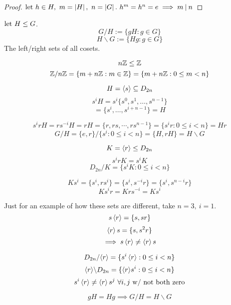 \documentclass[12pt]{article}
\newcommand{\order}[1]{\left\lvert#1\right\rvert}
\newcommand{\divides}{\mathbin|}
\newcommand\subgroup{\le}
\begin{document}
\bboxproof
\begin{proof}
    \(\llet\ h\in H,\ m=\order{H},\ n=\order{G}.\ h^m=h^n=e\implies m\divides n\)
\end{proof}
\ebox

\bboxdefn
\begin{defn}
    \(\llet\ H\subgroup G\).
    \[
        G/H:=\{
            gH : g\in G
        \}
    \]
    \[
        H\backslash G:=\{
            Hg : g\in G
        \}
    \]
    The left/right sets of all cosets.
\end{defn}
\ebox

\bboxexam
\begin{exam}
    \[
        n\Z\subgroup \Z
    \]
    \[
        \mathbb Z/n\mathbb Z = \{
            m + n\mathbb Z : m\in\mathbb Z
        \}=\{
            m + n\mathbb Z : 0\le m<n
        \}
    \]
\end{exam}
\ebox



\bboxexam
\begin{exam}
    \[
        H=\left\langle s\right\rangle\subseteq D_{2n}
    \]
    \[
        s^i H = s^i \{s^0,s^1,\dots,s^{n-1}\}
    \]
    \[
        =\{s^i,\dots,s^{i+n-1}\}=H
    \]

    \[
        s^irH=rs^{-i}H=rH=\{r,rs,\cdots,rs^{n-1}\}=
        \{s^ir:0\le i<n\}=Hr
    \]
    \[
        G/H=\{e,r\}/\{s^i:0\le i<n\}
        =\{H,rH\}=H\backslash G
    \]
\end{exam}
\ebox

\bboxexam
\begin{exam}
    \[
        K=\gen{r}\subgroup D_{2n}
    \]
    \[
        s^irK=s^iK
    \]
    \[
        D_{2n}/K=\{s^iK:0\le i<n\}
    \]

    \[
        Ks^i=\{s^i,rs^i\}=\{s^i,s^{-i}r\}=\{s^i,s^{n-i}r\}
    \]
    \[
        Ks^ir=Krs^{-i}=Ks^i
    \]

    Just for an example of how these sets are different, take
    \(n=3,\ i=1\).
    \[
        s\left\langle r\right\rangle=\{s,sr\}
    \]
    \[
        \left\langle r\right\rangle s=\{s,s^2r\}
    \]
    \[
        \implies s\left\langle r\right\rangle\neq\left\langle r\right\rangle s
    \]

    
    \[
        D_{2n}/\!\left\langle r\right\rangle=\{
            s^i\left\langle r\right\rangle:0\le i<n
        \}
    \]
    \[
        \left\langle r\right\rangle\!\backslash D_{2n}=\{
            \left\langle r\right\rangle\!s^i:0\le i<n
        \}
    \]
    \[
        s^i\gen{r}\neq\gen{r}s^j\ \forall i,j\ \TR{w/\ not\ both\ zero}
    \]
\end{exam}
\ebox

\bboxnote
\begin{note}
    \[
        gH=Hg\implies G/H=H\backslash G
    \]
\end{note}
\ebox
\end{document}
